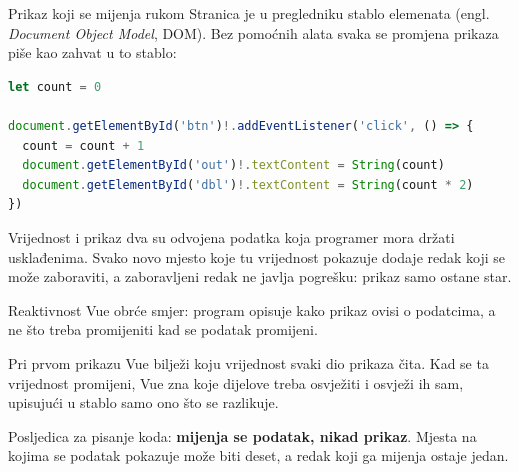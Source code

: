 \begin{frame}[fragile]{Prikaz koji se mijenja rukom}
Stranica je u pregledniku stablo elemenata (engl. \emph{Document Object Model}, DOM). Bez pomoćnih alata svaka se promjena prikaza piše kao zahvat u to stablo:

\begin{lstlisting}[language=typescript]
let count = 0

document.getElementById('btn')!.addEventListener('click', () => {
  count = count + 1
  document.getElementById('out')!.textContent = String(count)
  document.getElementById('dbl')!.textContent = String(count * 2)
})
\end{lstlisting}

\vspace{0.3em}
Vrijednost i prikaz dva su odvojena podatka koja programer mora držati usklađenima. Svako novo mjesto koje tu vrijednost pokazuje dodaje redak koji se može zaboraviti, a zaboravljeni redak ne javlja pogrešku: prikaz samo ostane star.
\end{frame}

\begin{frame}{Reaktivnost}
Vue obrće smjer: program opisuje kako prikaz ovisi o podatcima, a ne što treba promijeniti kad se podatak promijeni.

\vspace{0.9em}
Pri prvom prikazu Vue bilježi koju vrijednost svaki dio prikaza čita. Kad se ta vrijednost promijeni, Vue zna koje dijelove treba osvježiti i osvježi ih sam, upisujući u stablo samo ono što se razlikuje.

\vspace{0.9em}
Posljedica za pisanje koda: \textbf{mijenja se podatak, nikad prikaz}. Mjesta na kojima se podatak pokazuje može biti deset, a redak koji ga mijenja ostaje jedan.
\end{frame}

